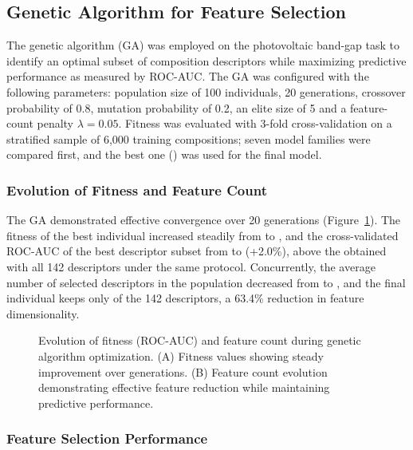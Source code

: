\subsection{Genetic Algorithm for Feature Selection}

The genetic algorithm (GA) was employed on the photovoltaic band-gap task to identify an
optimal subset of composition descriptors while maximizing predictive performance as measured
by ROC-AUC. The GA was configured with the following parameters: population size of 100
individuals, 20 generations, crossover probability of 0.8, mutation probability of 0.2, an
elite size of 5 and a feature-count penalty $\lambda = 0.05$. Fitness was evaluated with 3-fold
cross-validation on a stratified sample of 6,000 training compositions; seven model families
were compared first, and the best one (\GapBestModel{}) was used for the final model.



\subsubsection{Evolution of Fitness and Feature Count}

The GA demonstrated effective convergence over 20 generations (Figure~\ref{fig:ga}). The
fitness of the best individual increased steadily from \GAInitFit{} to \GAFinalFit{}, and the
cross-validated ROC-AUC of the best descriptor subset from \GAInitAUC{} to \GAFinalAUC{}
(+2.0\%), above the \GAAllCV{} obtained with all 142 descriptors under the same protocol.
Concurrently, the average number of selected descriptors in the population decreased from
\GAInitAvgN{} to \GAFinalAvgN{}, and the final individual keeps only \GAFinalN{} of the 142
descriptors, a 63.4\% reduction in feature dimensionality.

\begin{figure}[H]
  \centering
  \caption{Evolution of fitness (ROC-AUC) and feature count during genetic algorithm
  optimization. (A) Fitness values showing steady improvement over generations. (B) Feature
  count evolution demonstrating effective feature reduction while maintaining predictive
  performance.}\label{fig:ga}
\end{figure}

\subsubsection{Feature Selection Performance}

